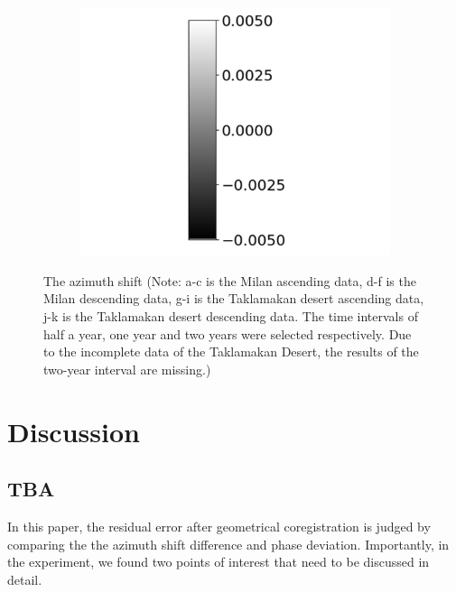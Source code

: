 \documentclass[preprint, authoryear]{elsarticle}
\begin{document}
\begin{figure}
\begin{subfigure}{0.3\textwidth}
        \centering
        \includegraphics[width=\textwidth]{figure/The azimuth shift/colorbar.png}
        \caption*{}
    \end{subfigure}
    \caption{The azimuth shift (Note: a-c is the Milan ascending data, d-f is the Milan descending data, g-i is the Taklamakan desert ascending data, j-k is the Taklamakan desert descending data. The time intervals of half a year, one year and two years were selected respectively. Due to the incomplete data of the Taklamakan Desert, the results of the two-year interval are missing.)}
    \label{fig_7}
\end{figure}


\section{Discussion}

\subsection{TBA}

In this paper, the residual error after geometrical coregistration is judged by comparing the the azimuth shift difference and phase deviation. Importantly, in the experiment, we found two points of interest that need to be discussed in detail. \par
\end{document}
